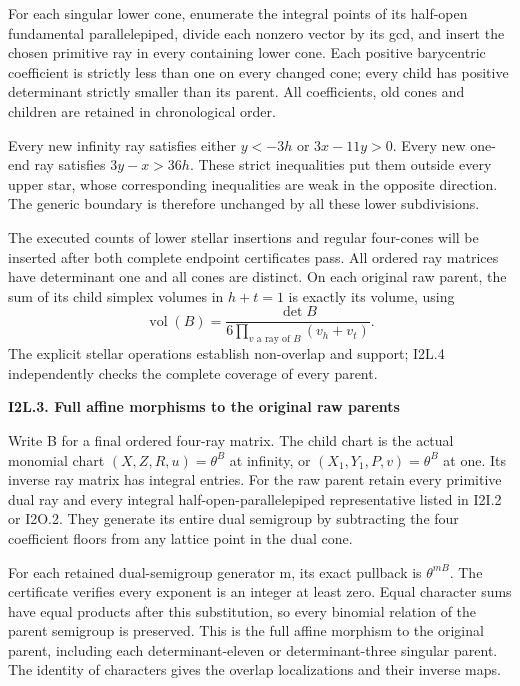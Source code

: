 For each singular lower cone, enumerate the
integral points of its half-open fundamental
parallelepiped, divide each nonzero vector by
its gcd, and insert the chosen primitive ray
in every containing lower cone. Each positive
barycentric coefficient is strictly less than
one on every changed cone; every child has
positive determinant strictly smaller than its
parent. All coefficients, old cones and children
are retained in chronological order.

Every new infinity ray satisfies either
\(y<-3h\) or \(3x-11y>0\). Every new one-end ray satisfies
\(3y-x>36h\). These strict inequalities put them
outside every upper star, whose corresponding
inequalities are weak in the opposite direction.
The generic boundary is therefore unchanged by
all these lower subdivisions.

The executed counts of lower stellar insertions and regular four-cones
will be inserted after both complete endpoint certificates pass. All ordered ray
matrices have determinant one and all cones
are distinct. On each original raw parent,
the sum of its child simplex volumes in
\(h+t=1\) is exactly its volume, using
\[
 \operatorname{vol}(B)
 =\frac{\det B}{6\prod_{v\text{ a ray of }B}(v_h+v_t)}.
 \tag{I2L.4}
\]
The explicit stellar operations establish
non-overlap and support; I2L.4 independently
checks the complete coverage of every parent.

\par

\medskip\noindent\textbf{I2L.3. Full affine morphisms to the original raw parents}

\par\nobreak

Write B for a final ordered four-ray matrix.
The child chart is the actual monomial chart
\((X,Z,R,u)=\theta^B\) at infinity, or
\((X_{1},Y_{1},P,v)=\theta^B\) at one. Its inverse ray
matrix has integral entries. For the raw
parent retain every primitive dual ray and
every integral half-open-parallelepiped
representative listed in I2I.2 or I2O.2.
They generate its entire dual semigroup by
subtracting the four coefficient floors from
any lattice point in the dual cone.

For each retained dual-semigroup generator m,
its exact pullback is \(\theta^{mB}\). The
certificate verifies every exponent is an
integer at least zero. Equal character sums
have equal products after this substitution,
so every binomial relation of the parent
semigroup is preserved. This is the full
affine morphism to the original parent,
including each determinant-eleven or
determinant-three singular parent. The
identity of characters gives the overlap
localizations and their inverse maps.

